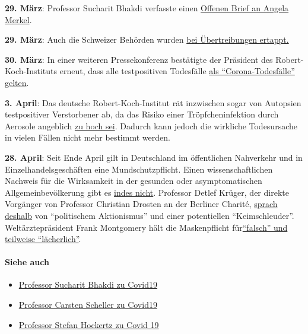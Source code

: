 \textbf{29. März}: Professor Sucharit Bhakdi verfasste einen
\href{https://swprs.org/offener-brief-von-professor-sucharit-bhakdi-an-bundeskanzlerin-dr-angela-merkel/}{Offenen
Brief an Angela Merkel}.

\textbf{29. März}: Auch die Schweizer Behörden wurden
\href{https://swprs.org/das-bag-im-corona-fieber/}{bei Übertreibungen
ertappt.}

\textbf{30. März}: In einer weiteren Pressekonferenz bestätigte der
Präsident des Robert-Koch-Instituts erneut, dass alle testpositiven
Todesfälle \href{https://youtu.be/oxfcJwJPy_I?start=1110\&end=1165}{als
``Corona-Todesfälle'' gelten}.

\textbf{3. April}: Das deutsche Robert-Koch-Institut rät inzwischen
sogar von Autopsien testpositiver Verstorbener ab, da das Risiko einer
Tröpfcheninfektion durch Aerosole angeblich
\href{https://www.youtube.com/watch?v=gSn_YaOYYcY}{zu hoch sei}. Dadurch
kann jedoch die wirkliche Todesursache in vielen Fällen nicht mehr
bestimmt werden.

\textbf{28. April}: Seit Ende April gilt in Deutschland im öffentlichen
Nahverkehr und in Einzel­handels­geschäften eine Mundschutzpflicht.
Einen wissenschaftlichen Nachweis für die Wirksamkeit in der gesunden
oder asymptomatischen Allgemeinbevölkerung gibt es
\href{https://infekt.ch/2020/04/atemschutzmasken-fuer-alle-medienhype-oder-unverzichtbar/}{indes
nicht}. Professor Detlef Krüger, der direkte Vorgänger von Professor
Christian Drosten an der Berliner Charité,
\href{https://de.sputniknews.com/interviews/20200425326953541-corona-gefahr-virologe/}{sprach
deshalb} von ``politischem Aktionismus'' und einer potentiellen
``Keimschleuder''. Weltärztepräsident Frank Montgomery hält die
Maskenpflicht
für\href{https://www.aerztezeitung.de/Politik/Montgomery-haelt-Maskenpflicht-fuer-falsch-408844.html}{``falsch''
und teilweise ``lächerlich''}.

\hypertarget{siehe-auch}{%
\paragraph{Siehe auch}\label{siehe-auch}}

\begin{itemize}
\tightlist
\item
  \href{https://www.youtube.com/watch?v=JBB9bA-gXL4}{Professor Sucharit
  Bhakdi zu Covid19}
\item
  \href{https://www.youtube.com/watch?v=w-uub0urNfw}{Professor Carsten
  Scheller zu Covid19}
\item
  \href{https://soundcloud.com/radiomuenchen/wir-kultivieren-mit-dieser-masnahme-den-corona-erreger}{Professor
  Stefan Hockertz zu Covid 19}
\end{itemize}

